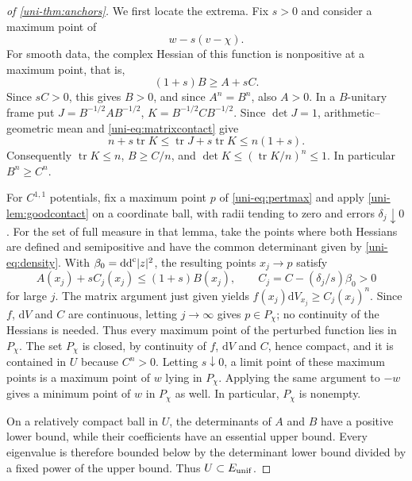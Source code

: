 \begin{proof}[of \cref{uni-thm:anchors}]
We first locate the extrema.  Fix $s>0$ and consider a maximum point of
\begin{equation}
  w-s(v-\chi).
 \label{uni-eq:pertmax}
\end{equation}
For smooth data, the complex Hessian of this function is nonpositive at a maximum point, that is,
\begin{equation}
  (1+s)B\geq A+sC.
 \label{uni-eq:matrixcontact}
\end{equation}
Since $sC>0$, this gives $B>0$, and since $A^n=B^n$, also
$A>0$.  In a $B$-unitary frame put
$J=B^{-1/2}AB^{-1/2}$, $K=B^{-1/2}CB^{-1/2}$.  Since $\det J=1$,
arithmetic--geometric mean and \eqref{uni-eq:matrixcontact} give
\[
 n+s\operatorname{tr}K\leq\operatorname{tr}J+s\operatorname{tr}K
 \leq n(1+s).
\]
Consequently $\operatorname{tr}K\leq n$, $B\geq C/n$, and
$\det K\leq(\operatorname{tr}K/n)^n\leq1$.  In particular $B^n\geq C^n$.

For $C^{1,1}$ potentials, fix a maximum point $p$ of
\eqref{uni-eq:pertmax} and apply \cref{uni-lem:goodcontact} on a coordinate
ball, with radii tending to zero and errors $\delta_j\downarrow0$.
For the set of full measure in that lemma, take the points where both Hessians are defined and semipositive and have the common determinant given by \eqref{uni-eq:density}.  With
$\beta_0=\mathrm{dd}^{\mathrm{c}}|z|^2$, the resulting points $x_j\to p$ satisfy
\[
 A(x_j)+s C_j(x_j)\leq(1+s)B(x_j),\qquad
 C_j=C-(\delta_j/s)\beta_0>0
\]
for large $j$.  The matrix argument just given yields
$f(x_j)\mathrm{d}V_{x_j}\geq C_j(x_j)^n$.  Since $f$, $\mathrm{d}V$ and $C$ are continuous, letting $j\to\infty$ gives $p\in P_\chi$; no
continuity of the Hessians is needed.  Thus every maximum point of
the perturbed function lies in $P_\chi$. The set $P_\chi$ is closed, by continuity of $f$, $\mathrm{d}V$ and $C$, hence compact, and it is contained in $U$ because $C^n>0$. Letting $s\downarrow0$, a limit point of these maximum points is a maximum point of $w$ lying in $P_\chi$.  Applying the same argument
to $-w$ gives a minimum point of $w$ in $P_\chi$ as well. In particular, $P_\chi$ is nonempty.

On a relatively compact ball in $U$, the determinants of $A$ and $B$
have a positive lower bound, while their coefficients have an essential
upper bound.  Every eigenvalue is therefore bounded below by the determinant
lower bound divided by a fixed power of the upper bound.  Thus
$U\subset E_{\rm unif}$.


\end{proof}

